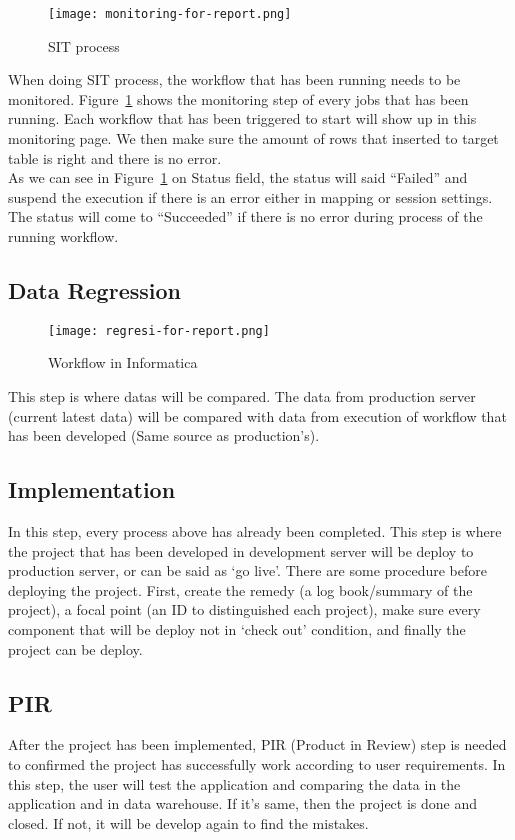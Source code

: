 \begin{figure}[H]
\centering
\texttt{[image: monitoring-for-report.png]}
\caption{SIT process}
\label{fig:sitinfa}
\end{figure}

When doing SIT process, the workflow that has been running needs to be monitored. Figure~\ref{fig:sitinfa} shows the monitoring step of every jobs that has been running. Each workflow that has been triggered to start will show up in this monitoring page. We then make sure the amount of rows that inserted to target table is right and there is no error.\\

As we can see in Figure~\ref{fig:sitinfa} on Status field, the status will said ``Failed'' and suspend the execution if there is an error either in mapping or session settings. The status will come to ``Succeeded'' if there is no error during process of the running workflow.

\subsection{Data Regression}

\begin{figure}[H]
\centering
\texttt{[image: regresi-for-report.png]}
\caption{Workflow in Informatica}
\label{fig:datainfa}
\end{figure}

This step is where datas will be compared. The data from production server (current latest data) will be compared with data from execution of workflow that has been developed (Same source as production's).

\subsection{Implementation}
In this step, every process above has already been completed. This step is where the project that has been developed in development server will be deploy to production server, or can be said as `go live'. There are some procedure before deploying the project. First, create the remedy (a log book/summary of the project), a focal point (an ID to distinguished each project), make sure every component that will be deploy not in `check out' condition, and finally the project can be deploy.

\subsection{PIR}
After the project has been implemented, PIR (Product in Review) step is needed to confirmed the project has successfully work according to user requirements. In this step, the user will test the application and comparing the data in the application and in data warehouse. If it's same, then the project is done and closed. If not, it will be develop again to find the mistakes.

